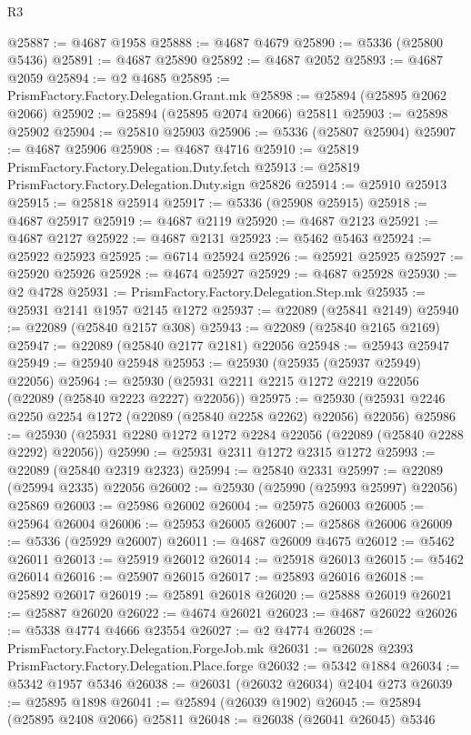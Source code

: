 \begin{lexlean}{R3}
\begin{coremodule}
@25887 := @4687 @1958
@25888 := @4687 @4679
@25890 := @5336 (@25800 @5436)
@25891 := @4687 @25890
@25892 := @4687 @2052
@25893 := @4687 @2059
@25894 := @2 @4685
@25895 := PrismFactory.Factory.Delegation.Grant.mk
@25898 := @25894 (@25895 @2062 @2066)
@25902 := @25894 (@25895 @2074 @2066) @25811
@25903 := @25898 @25902
@25904 := @25810 @25903
@25906 := @5336 (@25807 @25904)
@25907 := @4687 @25906
@25908 := @4687 @4716
@25910 := @25819 PrismFactory.Factory.Delegation.Duty.fetch
@25913 := @25819 PrismFactory.Factory.Delegation.Duty.sign @25826
@25914 := @25910 @25913
@25915 := @25818 @25914
@25917 := @5336 (@25908 @25915)
@25918 := @4687 @25917
@25919 := @4687 @2119
@25920 := @4687 @2123
@25921 := @4687 @2127
@25922 := @4687 @2131
@25923 := @5462 @5463
@25924 := @25922 @25923
@25925 := @6714 @25924
@25926 := @25921 @25925
@25927 := @25920 @25926
@25928 := @4674 @25927
@25929 := @4687 @25928
@25930 := @2 @4728
@25931 := PrismFactory.Factory.Delegation.Step.mk
@25935 := @25931 @2141 @1957 @2145 @1272
@25937 := @22089 (@25841 @2149)
@25940 := @22089 (@25840 @2157 @308)
@25943 := @22089 (@25840 @2165 @2169)
@25947 := @22089 (@25840 @2177 @2181) @22056
@25948 := @25943 @25947
@25949 := @25940 @25948
@25953 := @25930 (@25935 (@25937 @25949) @22056)
@25964 := @25930 (@25931 @2211 @2215 @1272 @2219 @22056 (@22089 (@25840 @2223 @2227) @22056))
@25975 := @25930 (@25931 @2246 @2250 @2254 @1272 (@22089 (@25840 @2258 @2262) @22056) @22056)
@25986 := @25930 (@25931 @2280 @1272 @1272 @2284 @22056 (@22089 (@25840 @2288 @2292) @22056))
@25990 := @25931 @2311 @1272 @2315 @1272
@25993 := @22089 (@25840 @2319 @2323)
@25994 := @25840 @2331
@25997 := @22089 (@25994 @2335) @22056
@26002 := @25930 (@25990 (@25993 @25997) @22056) @25869
@26003 := @25986 @26002
@26004 := @25975 @26003
@26005 := @25964 @26004
@26006 := @25953 @26005
@26007 := @25868 @26006
@26009 := @5336 (@25929 @26007)
@26011 := @4687 @26009 @4675
@26012 := @5462 @26011
@26013 := @25919 @26012
@26014 := @25918 @26013
@26015 := @5462 @26014
@26016 := @25907 @26015
@26017 := @25893 @26016
@26018 := @25892 @26017
@26019 := @25891 @26018
@26020 := @25888 @26019
@26021 := @25887 @26020
@26022 := @4674 @26021
@26023 := @4687 @26022
@26026 := @5338 @4774 @4666 @23554
@26027 := @2 @4774
@26028 := PrismFactory.Factory.Delegation.ForgeJob.mk
@26031 := @26028 @2393 PrismFactory.Factory.Delegation.Place.forge
@26032 := @5342 @1884
@26034 := @5342 @1957 @5346
@26038 := @26031 (@26032 @26034) @2404 @273
@26039 := @25895 @1898
@26041 := @25894 (@26039 @1902)
@26045 := @25894 (@25895 @2408 @2066) @25811
@26048 := @26038 (@26041 @26045) @5346

\end{coremodule}
\end{lexlean}

